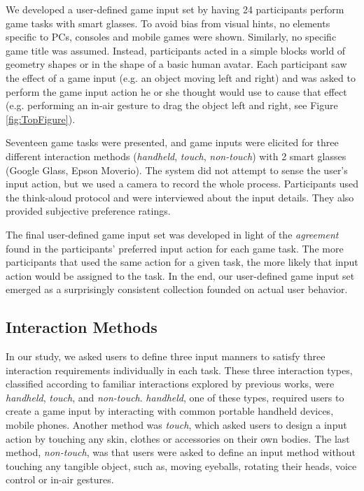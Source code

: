 \documentclass{sigchi}
\begin{document}
    We developed a user-defined game input set by having 24 participants perform game tasks with smart glasses. To avoid bias from visual hints\cite{Epps:2006:SHS:1125451.1125601}, no elements specific to PCs, consoles and mobile games were shown. Similarly, no specific game title was assumed. Instead, participants acted in a simple blocks world of geometry shapes or in the shape of a basic human avatar. Each participant saw the effect of a game input (e.g. an object moving left and right) and was asked to perform the game input action he or she thought would use to cause that effect (e.g. performing an in-air gesture to drag the object left and right, see Figure \ref{fig:TopFigure}). 

    Seventeen game tasks were presented, and game inputs were elicited for three different interaction methods (\emph{handheld}, \emph{touch}, \emph{non-touch}) with 2 smart glasses (Google Glass, Epson Moverio). The system did not attempt to sense the user's input action, but we used a camera to record the whole process. Participants used the think-aloud protocol and were interviewed about the input details. They also provided subjective preference ratings.

    The final user-defined game input set was developed in light of the \textsl{agreement} found in the participants' preferred input action for each game task. The more participants that used the same action for a given task, the more likely that input action would be assigned to the task. In the end, our user-defined game input set emerged as a surprisingly consistent collection founded on actual user behavior.

    \subsection {Interaction Methods}
    In our study, we asked users to define three input manners to satisfy three interaction requirements individually in each task. These three interaction types, classified according to familiar interactions explored by previous works, were \textsl{handheld}, \textsl{touch}, and \textsl{non-touch}. \textsl{handheld}, one of these types, required users to create a game input by interacting with common portable handheld devices, mobile phones. Another method was \textsl{touch}, which asked users to design a input action by touching any skin, clothes or accessories on their own bodies. The last method, \textsl{non-touch}, was that users were asked to define an input method without touching any tangible object, such as, moving eyeballs, rotating their heads, voice control or in-air gestures. 
\end{document}
